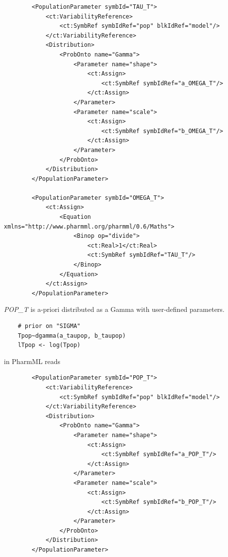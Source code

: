 \begin{lstlisting}
        <PopulationParameter symbId="TAU_T">
            <ct:VariabilityReference>
                <ct:SymbRef symbIdRef="pop" blkIdRef="model"/>
            </ct:VariabilityReference>
            <Distribution>
                <ProbOnto name="Gamma">
                    <Parameter name="shape">
                        <ct:Assign>
                            <ct:SymbRef symbIdRef="a_OMEGA_T"/>
                        </ct:Assign>
                    </Parameter>
                    <Parameter name="scale">
                        <ct:Assign>
                            <ct:SymbRef symbIdRef="b_OMEGA_T"/>
                        </ct:Assign>
                    </Parameter>
                </ProbOnto>
            </Distribution>
        </PopulationParameter>
        
        <PopulationParameter symbId="OMEGA_T">
            <ct:Assign>
                <Equation xmlns="http://www.pharmml.org/pharmml/0.6/Maths">
                    <Binop op="divide">
                        <ct:Real>1</ct:Real>
                        <ct:SymbRef symbIdRef="TAU_T"/>
                    </Binop>
                </Equation>
            </ct:Assign>
        </PopulationParameter>
\end{lstlisting}
\emph{POP\_T} is a-priori distributed as a Gamma with user-defined parameters.
\lstset{language=MLX}
\begin{lstlisting}
	# prior on "SIGMA"
	Tpop~dgamma(a_taupop, b_taupop)
	lTpop <- log(Tpop)
\end{lstlisting}
in PharmML reads
\lstset{language=XML}
\begin{lstlisting}
        <PopulationParameter symbId="POP_T">
            <ct:VariabilityReference>
                <ct:SymbRef symbIdRef="pop" blkIdRef="model"/>
            </ct:VariabilityReference>
            <Distribution>
                <ProbOnto name="Gamma">
                    <Parameter name="shape">
                        <ct:Assign>
                            <ct:SymbRef symbIdRef="a_POP_T"/>
                        </ct:Assign>
                    </Parameter>
                    <Parameter name="scale">
                        <ct:Assign>
                            <ct:SymbRef symbIdRef="b_POP_T"/>
                        </ct:Assign>
                    </Parameter>
                </ProbOnto>
            </Distribution>
        </PopulationParameter>
\end{lstlisting}



